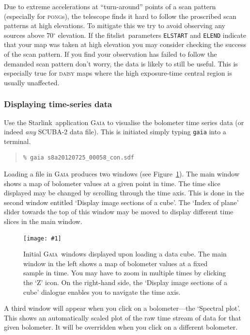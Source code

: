 \documentclass[twoside,11pt]{article}
\newcommand{\htmladdnormallink}[2]{#1}
\newcommand{\htmladdimg}[1]{}
\newcommand{\htmlref}[2]{#1}
\newcommand{\latexhtml}[2]{#1}
\newcommand{\xref}[3]{#1}
\newcommand{\xlabel}[1]{}
\renewcommand{\_}{\texttt{\symbol{95}}}
\newenvironment{myquote}{\begin{quote}\begin{small}}{\end{small}\end{quote}}
\newcommand{\starlink}{\htmladdnormallink{Starlink}{http://starlink.jach.hawaii.edu}}
\newcommand{\gaia}{\xref{\textsc{Gaia}}{sun214}{}}
\newcommand{\task}[1]{\textsf{#1}}
\newcommand{\param}[1]{\texttt{#1}}
\newcommand{\fitslist}{\xref{\task{fitslist}}{sun95}{FITSLIST}}
\newcommand{\myfig}[5]{
  \begin{figure}#2
    \centering\texttt{[image: \#1]}
    \typeout{#1.eps inserted on page \arabic{page}}
    \caption{\label{#4}\small #5}
  \end{figure}
}
\newcommand{\myfig}[5]{
    \label{#4} \htmladdimg{#1.png}\\
    \\
    Figure: #5\\
  }
\newcommand{\cref}[3]{\latexhtml{#1~\ref{#2}}{\htmlref{#3}{#2}}}
\begin{document}
Due to extreme accelerations at ``turn-around'' points of a scan
pattern (especially for \textsc{pong}s), the telescope finds it hard
to follow the proscribed scan patterns at high elevations. To mitigate
this we try to avoid observing any sources above 70$^\circ$ elevation.
If the \fitslist\ parameters \param{ELSTART} and \param{ELEND}
indicate that your map was taken at high elevation you may consider
checking the success of the scan pattern. If you find your observation
has failed to follow the demanded scan pattern don't worry, the data is
likely to still be useful. This is especially true for \textsc{daisy}
maps where the high exposure-time central region is usually
unaffected.

\subsubsection{\xlabel{display_cube}Displaying time-series data}
\label{sec:gaiacube}

Use the \starlink\ application \textsc{Gaia} to visualise the bolometer time
series data (or indeed \emph{any} SCUBA-2 data file). This is
initiated simply typing \texttt{gaia} into a terminal.

\begin{myquote}
\begin{verbatim}
% gaia s8a20120725_00058_con.sdf
\end{verbatim}
\end{myquote}

Loading a file in \textsc{Gaia} produces two windows (see
\cref{Figure}{fig:gaia_main}{upper graphic}). The main window shows a map of bolometer
values at a given point in time. The time slice displayed may be
changed by scrolling through the time axis. This is done in the second
window entitled `Display image sections of a cube'. The `Index of
plane' slider towards the top of this window may be moved to display
different time slices in the main window.

\myfig{sc21_gaia1}{[h!]}{width=\linewidth}{fig:gaia_main}{
  Initial \gaia\ windows displayed upon loading a data cube.
  The main window in the left shows a map of bolometer values at a fixed
  sample in time. You may have to zoom in multiple times by clicking the
  `Z' icon. On the right-hand side, the `Display image sections of a cube'
  dialogue enables you to navigate the time axis.}

A third window will appear when you click on a bolometer---the
`Spectral plot'. This shows an automatically scaled plot of the raw
time stream of data for that given bolometer. It will be overridden
when you click on a different bolometer.
\end{document}
